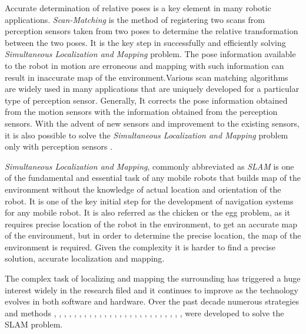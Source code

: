 Accurate determination of relative poses is a key element in many robotic applications. \textit{Scan-Matching} is the method of registering two scans from perception sensors taken from two poses to determine the relative transformation between the two poses. It is the key step in successfully and efficiently solving \textit{Simultaneous Localization and Mapping} problem. The pose information available to the robot in motion are erroneous and mapping with such information can result in inaccurate map of the environment.Various scan matching algorithms are widely used in many applications that are uniquely developed for a particular type of perception sensor. Generally, It corrects the pose information obtained from the motion sensors with the information obtained from the perception sensors\cite{GMap_algo}. With the advent of new sensors and improvement to the existing sensors, it is also possible to solve the \textit{Simultaneous Localization and Mapping} problem only with perception sensors \cite{loam}.

\textit{Simultaneous Localization and Mapping}, commonly abbreviated as \textit{SLAM} is one of the fundamental and essential task of any mobile robots that builds map of the environment without the knowledge of actual location and orientation of the robot. It is one of the key initial step for the development of navigation systems for any mobile robot. It is also referred as  the chicken or the egg problem, as it requires precise location of the robot in the environment, to get an accurate map of the environment, but in order to determine the precise location, the map of the environment is required. Given the complexity it is  harder to find a precise solution, accurate localization and mapping.

The complex task of localizing and mapping the surrounding has triggered a huge interest widely in the research filed and it continues to  improve as the technology evolves in both software and hardware. Over the past decade numerous strategies and methods \cite{A.Pratik}, \cite{E.Olson_Map}, \cite{T.seb_survey}, \cite{D.Hahnel}, \cite{M.Montemerlo}, \cite{W.Burgard}, \cite{GMap_algo}, \cite{G.Grisetti}, \cite{J.Kang}, \cite{K.Konolige}, \cite{W.Burgard}, \cite{T.Reineking}, \cite{D.Droeschel}, \cite{SUMA++}, \cite{VPS_SLAM}, \cite{RT_Graph}, \cite{chen2020rss}, \cite{loam}, \cite{ChanWF}, \cite{TatenoTLN17}, \cite{K.Ryu}, \cite{faucris.119665744}, \cite{Lu-2016-5572}, \cite{Mur_Artal_2015}, \cite{Mur_Artal_2017}, \cite{P.Agarwal}, \cite{segmap2018} were developed to solve the SLAM problem. 

